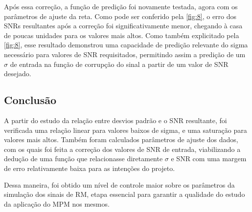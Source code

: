 \documentclass[
12pt,		
twoside, 
a4paper,
chapter=TITLE,
english,			
brazil]{USPSC-classe/USPSC}
\begin{document}
Após essa correção, a função de predição foi novamente testada, agora com os parâmetros de ajuste da reta.
Como pode ser conferido pela \autoref{fig:8}, o erro dos SNRs resultantes após a correção foi 
significativamente menor, chegando à casa de poucas unidades para os valores mais altos. Como também explicitado pela \autoref{fig:8}, esse resultado 
demonstrou uma capacidade de predição relevante do sigma necessário para valores de SNR requisitados, permitindo assim 
a predição de um $\sigma$ de entrada na função de corrupção do sinal a partir de um valor de SNR desejado. 

\subsection{Conclusão}

A partir do estudo da relação entre desvios padrão e o SNR resultante, 
foi verificada uma relação linear para valores baixos de sigma, e uma 
saturação para valores mais altos. Também foram calculados 
parâmetros de ajuste dos dados, com os quais foi feita a correção dos 
valores de SNR de entrada, viabilizando a dedução de uma função que 
relacionasse diretamente $\sigma$ e SNR com uma margem de erro 
relativamente baixa para as intenções do projeto. 

Dessa maneira, foi obtido um nível de controle maior sobre os parâmetros da simulação dos sinais de RM, etapa essencial para 
garantir a qualidade do estudo da aplicação do MPM nos mesmos.





\end{document}

